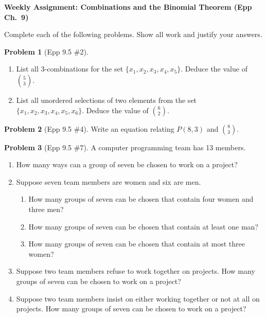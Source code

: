 \documentclass[11pt]{article}
\begin{document}
\begin{center}
  {\Large\bfseries Weekly Assignment: Combinations and the Binomial Theorem (Epp Ch.\ 9)}
\end{center}

\bigskip

\noindent
Complete each of the following problems.  Show all work and justify your answers.

\bigskip

\noindent\textbf{Problem 1} (Epp 9.5 \#2).
\begin{enumerate}[label=\alph*.]
  \item List all 3-combinations for the set $\{x_1, x_2, x_3, x_4, x_5\}$.
        Deduce the value of $\displaystyle\binom{5}{3}$.
  \item List all unordered selections of two elements from the set
        $\{x_1, x_2, x_3, x_4, x_5, x_6\}$.
        Deduce the value of $\displaystyle\binom{6}{2}$.
\end{enumerate}

\bigskip

\noindent\textbf{Problem 2} (Epp 9.5 \#4). \;
Write an equation relating $P(8, 3)$ and $\displaystyle\binom{8}{3}$.

\bigskip

\noindent\textbf{Problem 3} (Epp 9.5 \#7). \;
A computer programming team has 13 members.
\begin{enumerate}[label=\alph*.]
  \item How many ways can a group of seven be chosen to work on a project?
  \item Suppose seven team members are women and six are men.
    \begin{enumerate}[label=(\roman*)]
      \item How many groups of seven can be chosen that contain four women
            and three men?
      \item How many groups of seven can be chosen that contain at least
            one man?
      \item How many groups of seven can be chosen that contain at most
            three women?
    \end{enumerate}
  \item Suppose two team members refuse to work together on projects.
        How many groups of seven can be chosen to work on a project?
  \item Suppose two team members insist on either working together or
        not at all on projects.
        How many groups of seven can be chosen to work on a project?
\end{enumerate}
\end{document}
